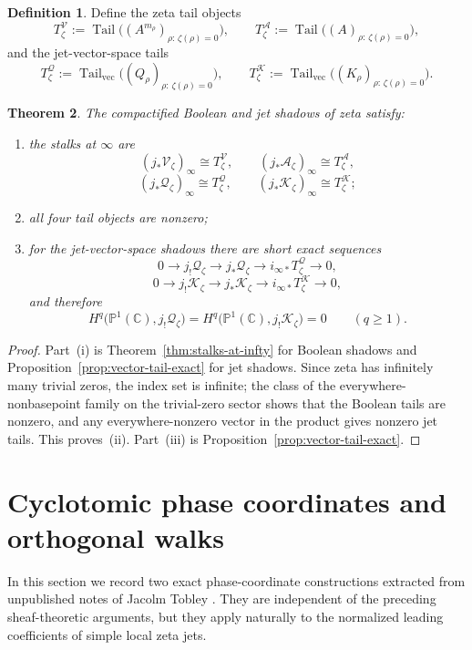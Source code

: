 \documentclass[11pt,a4paper]{article}
\newtheorem{theorem}{Theorem}[section]
\theoremstyle{definition}
\newtheorem{definition}[theorem]{Definition}
\theoremstyle{remark}
\DeclareMathOperator{\Tail}{Tail}
\newcommand{\CC}{\mathbb C}
\newcommand{\PP}{\mathbb P}
\newcommand{\cV}{\mathcal V}
\newcommand{\cA}{\mathcal A}
\newcommand{\cQ}{\mathcal Q}
\newcommand{\cK}{\mathcal K}
\begin{document}
\begin{definition}
Define the zeta tail objects
\[
T_\zeta^{\cV}:=\Tail\bigl((A^{m_\rho})_{\rho:\,\zeta(\rho)=0}\bigr),
\qquad
T_\zeta^{\cA}:=\Tail\bigl((A)_{\rho:\,\zeta(\rho)=0}\bigr),
\]
and the jet-vector-space tails
\[
T_\zeta^{\cQ}:=\Tail_{\mathrm{vec}}\bigl((Q_\rho)_{\rho:\,\zeta(\rho)=0}\bigr),
\qquad
T_\zeta^{\cK}:=\Tail_{\mathrm{vec}}\bigl((K_\rho)_{\rho:\,\zeta(\rho)=0}\bigr).
\]
\end{definition}

\begin{theorem}\label{thm:zeta-tail}
The compactified Boolean and jet shadows of zeta satisfy:
\begin{enumerate}[label=(\roman*)]
\item the stalks at $\infty$ are
\[
(j_*\cV_\zeta)_\infty\cong T_\zeta^{\cV},
\qquad
(j_*\cA_\zeta)_\infty\cong T_\zeta^{\cA},
\]
\[
(j_*\cQ_\zeta)_\infty\cong T_\zeta^{\cQ},
\qquad
(j_*\cK_\zeta)_\infty\cong T_\zeta^{\cK};
\]
\item all four tail objects are nonzero;
\item for the jet-vector-space shadows there are short exact sequences
\[
0\to j_!\cQ_\zeta\to j_*\cQ_\zeta\to i_{\infty*}T_\zeta^{\cQ}\to0,
\]
\[
0\to j_!\cK_\zeta\to j_*\cK_\zeta\to i_{\infty*}T_\zeta^{\cK}\to0,
\]
and therefore
\[
H^q\bigl(\PP^1(\CC),j_!\cQ_\zeta\bigr)=H^q\bigl(\PP^1(\CC),j_!\cK_\zeta\bigr)=0
\qquad(q\ge1).
\]
\end{enumerate}
\end{theorem}

\begin{proof}
Part~(i) is Theorem~\ref{thm:stalks-at-infty} for Boolean shadows and Proposition~\ref{prop:vector-tail-exact} for jet shadows.  Since zeta has infinitely many trivial zeros, the index set is infinite; the class of the everywhere-nonbasepoint family on the trivial-zero sector shows that the Boolean tails are nonzero, and any everywhere-nonzero vector in the product gives nonzero jet tails.  This proves~(ii).  Part~(iii) is Proposition~\ref{prop:vector-tail-exact}.
\end{proof}

\section{Cyclotomic phase coordinates and orthogonal walks}\label{sec:tobley}

In this section we record two exact phase-coordinate constructions extracted from unpublished notes of Jacolm Tobley \cite{Tobley}.  They are independent of the preceding sheaf-theoretic arguments, but they apply naturally to the normalized leading coefficients of simple local zeta jets.
\end{document}
